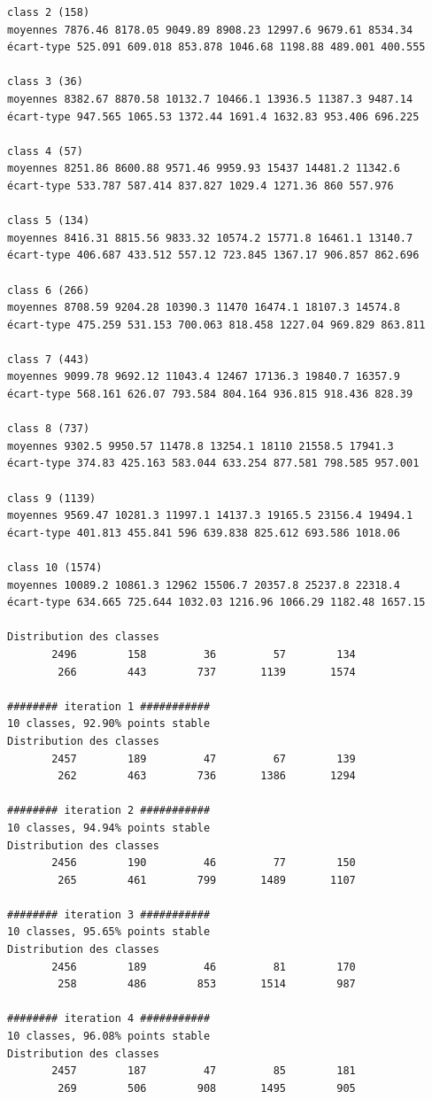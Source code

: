 \documentclass[earth,article,submit,pdftex,moreauthors]{Definitions/mdpi}
\begin{document}
\begin{scriptsize}
\begin{verbatim}
class 2 (158)
moyennes 7876.46 8178.05 9049.89 8908.23 12997.6 9679.61 8534.34
écart-type 525.091 609.018 853.878 1046.68 1198.88 489.001 400.555

class 3 (36)
moyennes 8382.67 8870.58 10132.7 10466.1 13936.5 11387.3 9487.14
écart-type 947.565 1065.53 1372.44 1691.4 1632.83 953.406 696.225

class 4 (57)
moyennes 8251.86 8600.88 9571.46 9959.93 15437 14481.2 11342.6
écart-type 533.787 587.414 837.827 1029.4 1271.36 860 557.976

class 5 (134)
moyennes 8416.31 8815.56 9833.32 10574.2 15771.8 16461.1 13140.7
écart-type 406.687 433.512 557.12 723.845 1367.17 906.857 862.696

class 6 (266)
moyennes 8708.59 9204.28 10390.3 11470 16474.1 18107.3 14574.8
écart-type 475.259 531.153 700.063 818.458 1227.04 969.829 863.811

class 7 (443)
moyennes 9099.78 9692.12 11043.4 12467 17136.3 19840.7 16357.9
écart-type 568.161 626.07 793.584 804.164 936.815 918.436 828.39

class 8 (737)
moyennes 9302.5 9950.57 11478.8 13254.1 18110 21558.5 17941.3
écart-type 374.83 425.163 583.044 633.254 877.581 798.585 957.001

class 9 (1139)
moyennes 9569.47 10281.3 11997.1 14137.3 19165.5 23156.4 19494.1
écart-type 401.813 455.841 596 639.838 825.612 693.586 1018.06

class 10 (1574)
moyennes 10089.2 10861.3 12962 15506.7 20357.8 25237.8 22318.4
écart-type 634.665 725.644 1032.03 1216.96 1066.29 1182.48 1657.15

Distribution des classes
       2496        158         36         57        134
        266        443        737       1139       1574

######## iteration 1 ###########
10 classes, 92.90% points stable
Distribution des classes
       2457        189         47         67        139
        262        463        736       1386       1294

######## iteration 2 ###########
10 classes, 94.94% points stable
Distribution des classes
       2456        190         46         77        150
        265        461        799       1489       1107

######## iteration 3 ###########
10 classes, 95.65% points stable
Distribution des classes
       2456        189         46         81        170
        258        486        853       1514        987

######## iteration 4 ###########
10 classes, 96.08% points stable
Distribution des classes
       2457        187         47         85        181
        269        506        908       1495        905


\end{verbatim}
\end{scriptsize}
\end{document}
